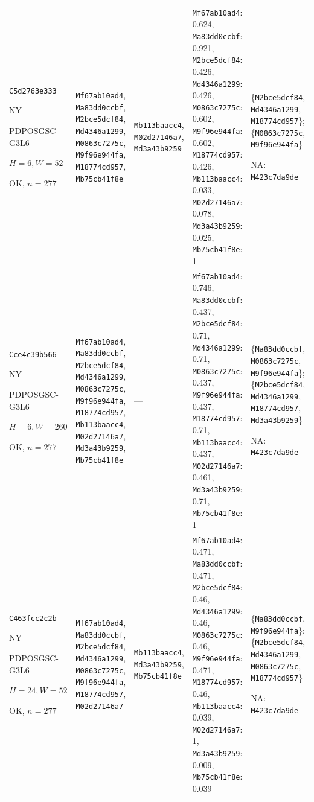 \begin{longtable}{p{.15\linewidth}p{.17\linewidth}p{.17\linewidth}p{.25\linewidth}p{.14\linewidth}}
\texttt{C5d2763e333}\par NY\par PDPOSGSC-\allowbreak{}G3L6\par $H=6,W=52$\par OK, $n=277$ & \texttt{Mf67ab10ad4}, \texttt{Ma83dd0ccbf}, \texttt{M2bce5dcf84}, \texttt{Md4346a1299}, \texttt{M0863c7275c}, \texttt{M9f96e944fa}, \texttt{M18774cd957}, \texttt{Mb75cb41f8e} & \texttt{Mb113baacc4}, \texttt{M02d27146a7}, \texttt{Md3a43b9259} & \texttt{Mf67ab10ad4}: 0.624, \texttt{Ma83dd0ccbf}: 0.921, \texttt{M2bce5dcf84}: 0.426, \texttt{Md4346a1299}: 0.426, \texttt{M0863c7275c}: 0.602, \texttt{M9f96e944fa}: 0.602, \texttt{M18774cd957}: 0.426, \texttt{Mb113baacc4}: 0.033, \texttt{M02d27146a7}: 0.078, \texttt{Md3a43b9259}: 0.025, \texttt{Mb75cb41f8e}: 1 & \{\texttt{M2bce5dcf84}, \texttt{Md4346a1299}, \texttt{M18774cd957}\}; \{\texttt{M0863c7275c}, \texttt{M9f96e944fa}\}\par NA: \texttt{M423c7da9de} \\
\texttt{Cce4c39b566}\par NY\par PDPOSGSC-\allowbreak{}G3L6\par $H=6,W=260$\par OK, $n=277$ & \texttt{Mf67ab10ad4}, \texttt{Ma83dd0ccbf}, \texttt{M2bce5dcf84}, \texttt{Md4346a1299}, \texttt{M0863c7275c}, \texttt{M9f96e944fa}, \texttt{M18774cd957}, \texttt{Mb113baacc4}, \texttt{M02d27146a7}, \texttt{Md3a43b9259}, \texttt{Mb75cb41f8e} & --- & \texttt{Mf67ab10ad4}: 0.746, \texttt{Ma83dd0ccbf}: 0.437, \texttt{M2bce5dcf84}: 0.71, \texttt{Md4346a1299}: 0.71, \texttt{M0863c7275c}: 0.437, \texttt{M9f96e944fa}: 0.437, \texttt{M18774cd957}: 0.71, \texttt{Mb113baacc4}: 0.437, \texttt{M02d27146a7}: 0.461, \texttt{Md3a43b9259}: 0.71, \texttt{Mb75cb41f8e}: 1 & \{\texttt{Ma83dd0ccbf}, \texttt{M0863c7275c}, \texttt{M9f96e944fa}\}; \{\texttt{M2bce5dcf84}, \texttt{Md4346a1299}, \texttt{M18774cd957}, \texttt{Md3a43b9259}\}\par NA: \texttt{M423c7da9de} \\
\texttt{C463fcc2c2b}\par NY\par PDPOSGSC-\allowbreak{}G3L6\par $H=24,W=52$\par OK, $n=277$ & \texttt{Mf67ab10ad4}, \texttt{Ma83dd0ccbf}, \texttt{M2bce5dcf84}, \texttt{Md4346a1299}, \texttt{M0863c7275c}, \texttt{M9f96e944fa}, \texttt{M18774cd957}, \texttt{M02d27146a7} & \texttt{Mb113baacc4}, \texttt{Md3a43b9259}, \texttt{Mb75cb41f8e} & \texttt{Mf67ab10ad4}: 0.471, \texttt{Ma83dd0ccbf}: 0.471, \texttt{M2bce5dcf84}: 0.46, \texttt{Md4346a1299}: 0.46, \texttt{M0863c7275c}: 0.46, \texttt{M9f96e944fa}: 0.471, \texttt{M18774cd957}: 0.46, \texttt{Mb113baacc4}: 0.039, \texttt{M02d27146a7}: 1, \texttt{Md3a43b9259}: 0.009, \texttt{Mb75cb41f8e}: 0.039 & \{\texttt{Ma83dd0ccbf}, \texttt{M9f96e944fa}\}; \{\texttt{M2bce5dcf84}, \texttt{Md4346a1299}, \texttt{M0863c7275c}, \texttt{M18774cd957}\}\par NA: \texttt{M423c7da9de} \\

\end{longtable}

